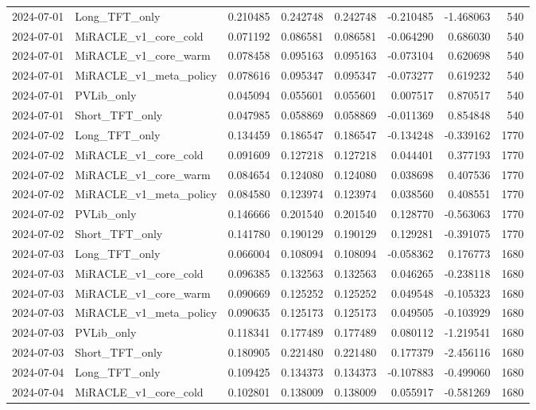 \begin{tabular}{llrrrrrr}
2024-07-01 & Long_TFT_only & 0.210485 & 0.242748 & 0.242748 & -0.210485 & -1.468063 & 540 \\
2024-07-01 & MiRACLE_v1_core_cold & 0.071192 & 0.086581 & 0.086581 & -0.064290 & 0.686030 & 540 \\
2024-07-01 & MiRACLE_v1_core_warm & 0.078458 & 0.095163 & 0.095163 & -0.073104 & 0.620698 & 540 \\
2024-07-01 & MiRACLE_v1_meta_policy & 0.078616 & 0.095347 & 0.095347 & -0.073277 & 0.619232 & 540 \\
2024-07-01 & PVLib_only & 0.045094 & 0.055601 & 0.055601 & 0.007517 & 0.870517 & 540 \\
2024-07-01 & Short_TFT_only & 0.047985 & 0.058869 & 0.058869 & -0.011369 & 0.854848 & 540 \\
2024-07-02 & Long_TFT_only & 0.134459 & 0.186547 & 0.186547 & -0.134248 & -0.339162 & 1770 \\
2024-07-02 & MiRACLE_v1_core_cold & 0.091609 & 0.127218 & 0.127218 & 0.044401 & 0.377193 & 1770 \\
2024-07-02 & MiRACLE_v1_core_warm & 0.084654 & 0.124080 & 0.124080 & 0.038698 & 0.407536 & 1770 \\
2024-07-02 & MiRACLE_v1_meta_policy & 0.084580 & 0.123974 & 0.123974 & 0.038560 & 0.408551 & 1770 \\
2024-07-02 & PVLib_only & 0.146666 & 0.201540 & 0.201540 & 0.128770 & -0.563063 & 1770 \\
2024-07-02 & Short_TFT_only & 0.141780 & 0.190129 & 0.190129 & 0.129281 & -0.391075 & 1770 \\
2024-07-03 & Long_TFT_only & 0.066004 & 0.108094 & 0.108094 & -0.058362 & 0.176773 & 1680 \\
2024-07-03 & MiRACLE_v1_core_cold & 0.096385 & 0.132563 & 0.132563 & 0.046265 & -0.238118 & 1680 \\
2024-07-03 & MiRACLE_v1_core_warm & 0.090669 & 0.125252 & 0.125252 & 0.049548 & -0.105323 & 1680 \\
2024-07-03 & MiRACLE_v1_meta_policy & 0.090635 & 0.125173 & 0.125173 & 0.049505 & -0.103929 & 1680 \\
2024-07-03 & PVLib_only & 0.118341 & 0.177489 & 0.177489 & 0.080112 & -1.219541 & 1680 \\
2024-07-03 & Short_TFT_only & 0.180905 & 0.221480 & 0.221480 & 0.177379 & -2.456116 & 1680 \\
2024-07-04 & Long_TFT_only & 0.109425 & 0.134373 & 0.134373 & -0.107883 & -0.499060 & 1680 \\
2024-07-04 & MiRACLE_v1_core_cold & 0.102801 & 0.138009 & 0.138009 & 0.055917 & -0.581269 & 1680 \\

\end{tabular}
